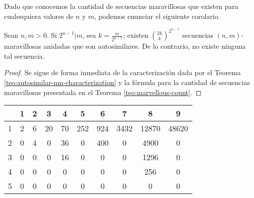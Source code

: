 \documentclass[11pt]{article}
\begin{document}
Dado que conocemos la cantidad de secuencias maravillosas que existen para
cualesquiera valores de $n$ y $m$, podemos enunciar el siguiente corolario.

\begin{coro} \label{coro:autosimilar-nm-count}
	Sean $n, m > 0$.
	Si $2^{n-1} \vert m$, sea $k = \frac{m}{2^{n-1}}$; existen
	$\binom{2k}{k}^{2^{n-1}}$ secuencias $(n,m)$-maravillosas anidadas que son
	autosimilares.
	De lo contrario, no existe ninguna tal secuencia.
\end{coro}

\begin{proof}
	Se sigue de forma inmediata de la caracterización dada por el Teorema
	\ref{teo:autosimilar-nm-characterization} y la fórmula para la cantidad de
	secuencias maravillosas presentada en el Teorema \ref{teo:marvellous-count}.
\end{proof}

\begin{center}
	\begin{tabular}{ c | c | c | c | c | c | c | c | c | c }
		  & 1 & 2 & 3  & 4  & 5   & 6   & 7    & 8     & 9     \\
		\hline
		1 & 2 & 6 & 20 & 70 & 252 & 924 & 3432 & 12870 & 48620
		\\ \hline
		2 & 0 & 4 & 0  & 36 & 0   & 400 & 0    & 4900  & 0     \\
		\hline
		3 & 0 & 0 & 0  & 16 & 0   & 0   & 0    & 1296  & 0     \\
		\hline
		4 & 0 & 0 & 0  & 0  & 0   & 0   & 0    & 256   & 0     \\
		\hline
		5 & 0 & 0 & 0  & 0  & 0   & 0   & 0    & 0     & 0
	\end{tabular}
\end{center}

{}

\end{document}
